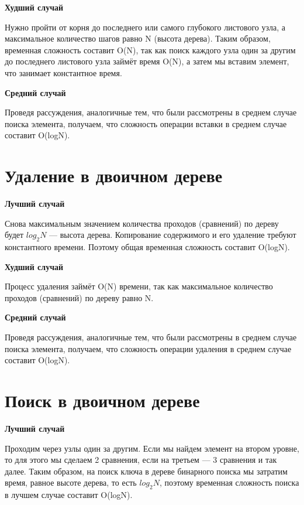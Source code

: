 \documentclass[bachelor, och, referat, times]{SCWorks}
\begin{document}
\textbf{Худший случай}

Нужно пройти от корня до последнего или самого глубокого листового узла, 
а максимальное количество шагов равно N (высота дерева). 
Таким образом, временная сложность составит O(N), 
так как поиск каждого узла один за другим до последнего листового узла займёт время O(N), 
а затем мы вставим элемент, что занимает константное время.
\vspace{5mm}

\textbf{Средний случай}

Проведя рассуждения, аналогичные тем, 
что были рассмотрены в среднем случае поиска элемента, получаем, 
что сложность операции вставки в среднем случае составит O(logN).



 \section{Удаление в двоичном дереве}

\textbf{ Лучший случай}

Снова максимальным значением количества проходов (сравнений) по дереву будет 
$log_2N$ — высота дерева. Копирование содержимого и его удаление требуют константного времени. 
Поэтому общая временная сложность составит O(logN).


\textbf{Худший случай}

Процесс удаления займёт O(N) времени, так как максимальное количество проходов 
(сравнений) по дереву равно N.


\textbf{Средний случай}

Проведя рассуждения, аналогичные тем, 
что были рассмотрены в среднем случае поиска элемента, 
получаем, что сложность операции удаления в среднем случае составит O(logN).

 

  \section{Поиск в двоичном дереве}


\textbf{Лучший случай}

Проходим через узлы один за другим. 
Если мы найдем элемент на втором уровне, 
то для этого мы сделаем 2 сравнения, если на третьем — 3 сравнения и так далее. 
Таким образом, на поиск ключа в дереве бинарного поиска мы затратим время, 
равное высоте дерева, то есть $log_2N$, поэтому временная сложность 
 поиска в лучшем случае составит O(logN).
 \vspace{5mm}
\end{document}
